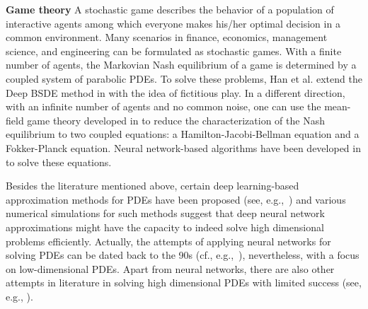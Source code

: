\documentclass[12pt]{article}
\theoremstyle{definition}
\begin{document}
\vspace{.1in}
\noindent
{\bf Game theory}
A stochastic game describes the behavior of a population of interactive agents among which everyone makes his/her optimal decision in a common environment. Many scenarios in finance, economics, management science, and engineering can be formulated as stochastic games. 
%
With a finite number of agents, the Markovian Nash equilibrium of a game is determined by a coupled system of parabolic PDEs. 
To solve these problems, Han et al. extend the Deep BSDE method in \cite{Han2019deep,han2020convergence} with the idea of fictitious play. 
In a different direction, with an infinite number of agents and no common noise, one can use the mean-field game theory developed in \cite{LaLi1:2006,LaLi2:2006,LaLi:2007,HuMaCa:06,HuCaMa:07} to reduce the characterization of the Nash equilibrium to two coupled equations: a 
Hamilton-Jacobi-Bellman equation and a Fokker-Planck equation. Neural network-based algorithms have been developed in \cite{Carmona2019convergence1,Carmona2019convergence2,Ruthotto2020machine,Lin2020apac} to solve these equations.

\vspace{.1in}
Besides the literature mentioned above, certain deep learning-based approximation methods for PDEs have been proposed (see, e.g.,~\cite{berg2018unified,dockhorn2019discussion,farahmand2017deep,fujii2019asymptotic,goudenege2019variance,jacquier2019deep,lye2020deep,magill2018neural,nusken2020solving,pham2019neural,raissi2018deep,cai2018approximating,zhang2019quantifying}) and various numerical simulations for such methods suggest that deep neural network approximations might have the capacity to indeed solve high dimensional problems efficiently. Actually, the attempts of applying neural networks for solving PDEs can be dated back to the 90s (cf., e.g.,~\cite{lee1990neural,uchiyama1993solving,lagaris1998artificial,jianyu2003numerical}), nevertheless, with a focus on low-dimensional PDEs.
Apart from neural networks, there are also other attempts in literature in solving high dimensional PDEs with limited success (see, e.g., \cite{bally2003quantization,von2004numerical,zhang2004numerical,bouchard2004discrete,gobet2005regression,delarue2006forward,bender2007forward,gobet2008numerical,briand2014simulation,geiss2016simulation,gobet2010solving,fahim2011probabilistic,crisan2010probabilistic,crisan2010monte,crisan2012solving,crisan2014second,labart2013parallel,pham2015feynman,guo2015monotone,gobet2016stratified,gobet2016approximation,gobet2016linear,warin2018nesting,warin2018monte,ruszczynski2017dual,billaud2018stochastic}).
\end{document}
